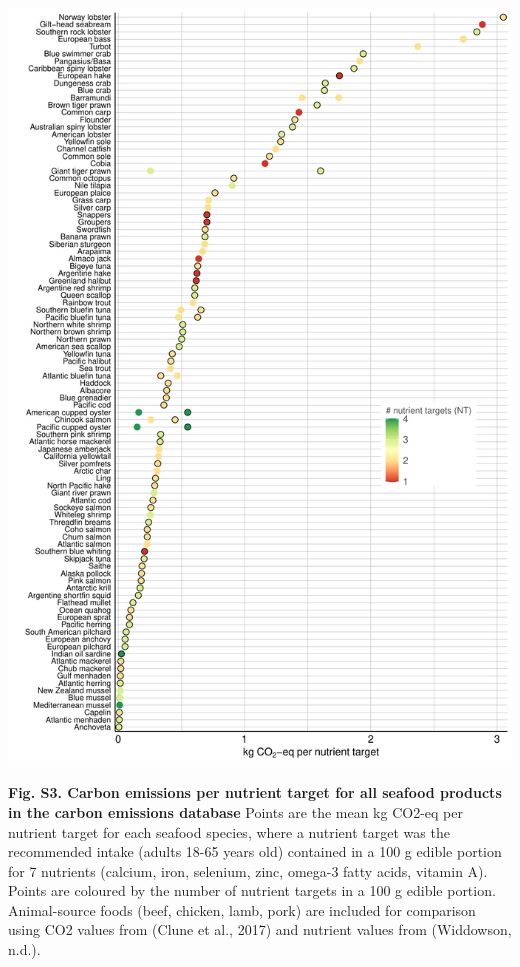 \documentclass[
]{article}
\begin{document}
\newpage

\begin{center}\includegraphics[height=0.8\textheight]{fig/final/FigureS3} \end{center}

\textbf{Fig. S3. Carbon emissions per nutrient target for all seafood
products in the carbon emissions database} Points are the mean kg CO2-eq
per nutrient target for each seafood species, where a nutrient target
was the recommended intake (adults 18-65 years old) contained in a 100 g
edible portion for 7 nutrients (calcium, iron, selenium, zinc, omega-3
fatty acids, vitamin A). Points are coloured by the number of nutrient
targets in a 100 g edible portion. Animal-source foods (beef, chicken,
lamb, pork) are included for comparison using CO2 values from (Clune et
al., 2017) and nutrient values from (Widdowson, n.d.).
\end{document}
